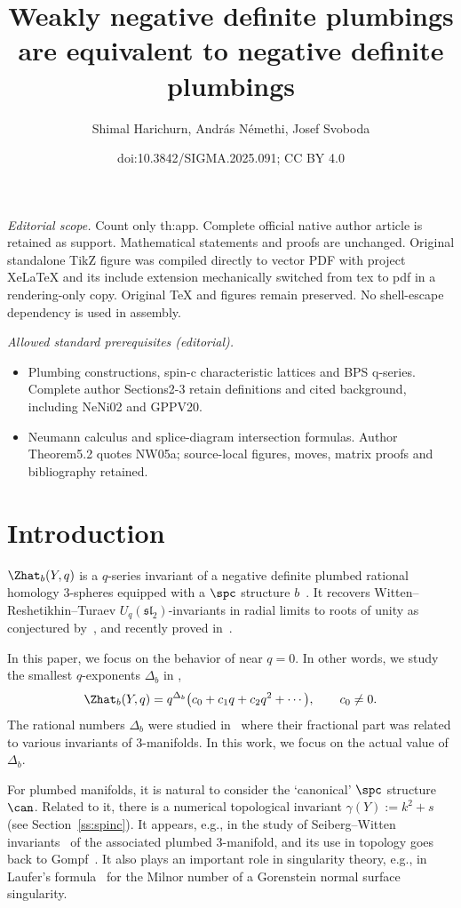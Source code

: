 \documentclass[10pt,a4paper]{amsart}
\title{Weakly negative definite plumbings are equivalent to negative definite plumbings}
\author{Shimal Harichurn, András Némethi, Josef Svoboda}
\date{doi:10.3842/SIGMA.2025.091; CC BY 4.0}
\begin{document}
\maketitle
\noindent\textit{Editorial scope.} Count only th:app. Complete official native author article is retained as support. Mathematical statements and proofs are unchanged. Original standalone TikZ figure was compiled directly to vector PDF with project XeLaTeX and its include extension mechanically switched from tex to pdf in a rendering-only copy. Original TeX and figures remain preserved. No shell-escape dependency is used in assembly.\par\medskip
\noindent\textit{Allowed standard prerequisites (editorial).}\begin{itemize}
\item Plumbing constructions, spin-c characteristic lattices and BPS q-series. Complete author Sections2-3 retain definitions and cited background, including NeNi02 and GPPV20.
\item Neumann calculus and splice-diagram intersection formulas. Author Theorem5.2 quotes NW05a; source-local figures, moves, matrix proofs and bibliography retained.
\end{itemize}\medskip
\section{Introduction}

$\Zhat_b(Y, q)$ is a $q$-series invariant of a negative definite plumbed rational homology 3-spheres equipped with a $\spc$ structure $b$~\cite{GPPV20}. It recovers Witten--Reshetikhin--Turaev $U_q(\mathfrak{sl}_2)$-invariants in radial limits to roots of unity as conjectured by~\cite{GPPV20}, and recently proved in~\cite{Mur23}.

In this paper, we focus on the behavior of  near $q=0$. In other words, we study the smallest $q$-exponents $\Delta_b$ in ,
\[
 \Zhat_b(Y,q) = q^{\Delta_b}\bigl(c_0+c_1 q + c_2 q^2 + \cdots\bigr), \qquad c_0 \neq 0.
\]
The rational numbers $\Delta_b$ were studied in~\cite{GPP21} where their fractional part was related to various invariants of 3-manifolds. In this work, we focus on the actual value of $\Delta_b$.

For plumbed manifolds, it is natural to consider the `canonical' $\spc$ structure $\can$. Related to it, there is a numerical topological invariant $\gamma(Y) := k^2+s$ (see Section~\ref{ss:spinc}).
It appears, e.g., in the study of Seiberg--Witten invariants~\cite{NeNi02} of the associated plumbed 3-manifold, and its use in topology goes back to Gompf~\cite{Gompf98}. It also plays an important role in singularity theory, e.g., in Laufer's formula~\cite{Laufer1977} for the Milnor number of a Gorenstein normal surface singularity.
\end{document}
